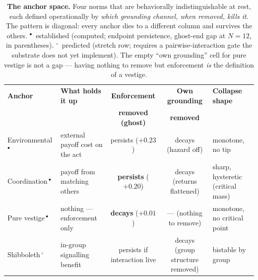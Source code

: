 \begin{table}[t]
\centering
\small
\setlength{\tabcolsep}{6pt}
\renewcommand{\arraystretch}{1.25}
\begin{tabular}{@{}l l c c l@{}}
\toprule
\textbf{Anchor} & \textbf{What holds it up} & \textbf{Enforcement} & \textbf{Own grounding} & \textbf{Collapse shape} \\
 & & \textbf{removed (ghost)} & \textbf{removed} & \\
\midrule
Environmental\,$^{\bullet}$      & external payoff cost on the act    & persists ($+0.23$) & decays (hazard off)       & monotone, no tip \\
Coordination\,$^{\bullet}$       & payoff from matching others        & \textbf{persists} ($+0.20$) & decays (returns flattened) & sharp, hysteretic (critical mass) \\
Pure vestige\,$^{\bullet}$       & nothing --- enforcement only       & \textbf{decays} ($+0.01$)   & --- (nothing to remove)   & monotone, no critical point \\
Shibboleth\,$^{\circ}$           & in-group signalling benefit        & persists if interaction live & decays (group structure removed) & bistable by group \\
\bottomrule
\end{tabular}
\caption{\textbf{The anchor space.} Four norms that are behaviorally indistinguishable at
rest, each defined operationally by \emph{which grounding channel, when removed, kills it}.
The pattern is diagonal: every anchor dies to a different column and survives the others.
$^{\bullet}$~established (computed; endpoint persistence, ghost-end gap at $N{=}12$, in
parentheses). $^{\circ}$~predicted (stretch row; requires a pairwise-interaction gate the
substrate does not yet implement). The empty ``own grounding'' cell for pure vestige is not
a gap --- having nothing to remove but enforcement \emph{is} the definition of a vestige.}
\label{tab:anchor_space}
\end{table}

